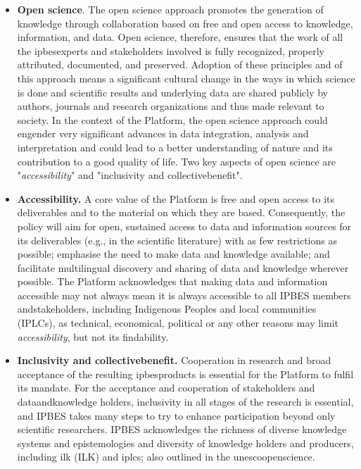 \documentclass{article}
\begin{document}
\begin{itemize}
    \item \textbf{Open science}. The open science approach promotes the generation of \gls{knowledge} through collaboration based on free and open access to \gls{knowledge}, information, and \gls{data}. Open science, therefore, ensures that the work of all the \glspl{ipbesexpert} and \glspl{stakeholder} involved is fully recognized, properly attributed, documented, and preserved. Adoption of these principles and of this approach means a significant cultural change in the ways in which science is done and scientific results and underlying \gls{data} are shared publicly by authors, journals and research organizations and thus made relevant to society. In the context of the Platform, the open science approach could engender very significant advances in \gls{data} integration, analysis and interpretation and could lead to a better understanding of nature and its contribution to a good quality of life. Two key aspects of open science are "\textit{accessibility}" and "inclusivity and \gls{collectivebenefit}".
    \item \textbf{Accessibility.} A core value of the Platform is free and open access to its deliverables and to the material on which they are based. Consequently, the policy will aim for open, sustained access to \gls{data} and information sources for its deliverables (e.g., in the scientific literature) with as few restrictions as possible; emphasise the need to make data and knowledge available;  and facilitate multilingual discovery and sharing of \gls{data} and knowledge wherever possible. The Platform acknowledges that making \gls{data} and information accessible may not always mean it is always accessible to all IPBES members and\glspl{stakeholder}, including Indigenous Peoples and local communities (IPLCs), as technical, economical, political or any other reasons may limit \textit{accessibility}, but not its findability.
    \item \textbf{Inclusivity and \gls{collectivebenefit}.} Cooperation in \gls{research} and broad acceptance of the resulting \glspl{ipbesproduct} is essential for the Platform to fulfil its mandate. For the acceptance and cooperation of \glspl{stakeholder} and \gls{dataandknowledge} holders, inclusivity in all stages of the \gls{research} is essential, and IPBES takes many steps to try to enhance participation beyond only scientific researchers. IPBES acknowledges the richness of diverse knowledge systems and epistemologies and diversity of knowledge holders and producers, including \gls{ilk} (ILK) and \glspl{iplc}; also outlined in the \gls{unescoopenscience}.
\end{itemize}
\end{document}
